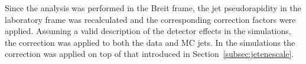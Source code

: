 Since the analysis was performed in the Breit frame, the jet pseudorapidity in the laboratory frame was recalculated and the corresponding correction factors were applied. Assuming a valid description of the detector effects in the simulations, the correction was applied to both the data and MC jets. In the simulations the correction was applied on top of that introduced in Section~\ref{subsec:jetenescale}.

